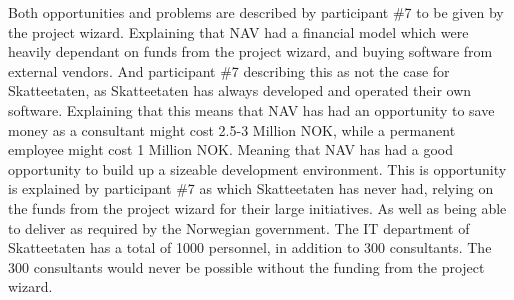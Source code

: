 
Both opportunities and problems are described by participant \#7 to be given by the project wizard. Explaining that NAV had a financial model which were heavily dependant on funds from the project wizard, and buying software from external vendors. And participant \#7 describing this as not the case for Skatteetaten, as Skatteetaten has always developed and operated their own software. Explaining that this means that NAV has had an opportunity to save money as a consultant might cost 2.5-3 Million NOK, while a permanent employee might cost 1 Million NOK. Meaning that NAV has had a good opportunity to build up a sizeable development environment. This is opportunity is explained by participant \#7 as which Skatteetaten has never had, relying on the funds from the project wizard for their large initiatives. As well as being able to deliver as required by the Norwegian government. The IT department of Skatteetaten has a total of 1000 personnel, in addition to 300 consultants. The 300 consultants would never be possible without the funding from the project wizard.


